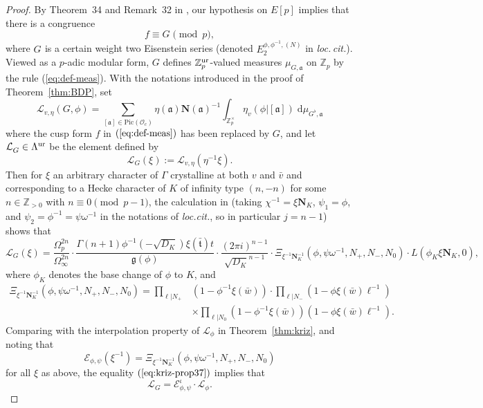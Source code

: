 \documentclass[10pt]{amsart}
\numberwithin{equation}{section}
\theoremstyle{definition}
\theoremstyle{remark}
\newcommand{\Z}{\mathbb{Z}}
\newcommand{\Lcal}{\mathcal{L}}
\begin{document}
\begin{proof} 
By Theorem~34 and Remark~32 in \cite{kriz}, our hypothesis on $E[p]$ implies that there is a congruence
\begin{equation}\label{eq:cong-mf}
f\equiv G^{}\pmod{p},
\end{equation}
where $G^{}$ is a certain weight two Eisenstein series (denoted $E_{2}^{\phi,\phi^{-1},(N)}$ in \emph{loc.\,cit.}). 
Viewed as a $p$-adic modular form, $G$ defines $\Z_p^{\rm ur}$-valued measures $\mu_{G,\mathfrak{a}}$
on $\Z_p$ by the rule (\ref{eq:def-meas}). With the notations introduced in the proof of Theorem~\ref{thm:BDP}, set
\begin{equation}\label{eq:Eis-measure}
\mathscr{L}_{v,\eta}(G,\phi)=
\sum_{[\mathfrak{a}]\in\mathrm{Pic}(\mathcal{O}_c)}
\eta(\mathfrak{a})\mathbf{N}(\mathfrak{a})^{-1}
\int_{\Z_p^\times}\eta_v(\phi\vert[\mathfrak{a}])\;\mathrm{d}\mu_{G^\flat,{\mathfrak{a}}}
\end{equation}
where the cusp form $f$ in $(\ref{eq:def-meas})$ has been replaced by $G$, and let $\mathcal{L}_G^{}\in\Lambda^{\rm ur}$ be the element defined by 
\[
\Lcal_G(\xi):=\mathscr{L}_{v,\eta}(\eta^{-1}\xi).
\]
Then for $\xi$ an arbitrary character of $\Gamma$ crystalline at both $v$ and $\bar{v}$ and corresponding to a Hecke character of $K$ of infinity type $(n,-n)$ for some $n\in\Z_{>0}$ with $n\equiv 0\pmod{p-1}$, the calculation in \cite[Prop.~37]{kriz} (taking $\chi^{-1}=\xi\mathbf{N}_K$, $\psi_1=\phi$, and $\psi_2=\phi^{-1}=\psi\omega^{-1}$ in the notations of \emph{loc.cit.}, so in particular $j=n-1$) shows that
\begin{equation}\label{eq:kriz-prop37}
\Lcal_G(\xi)=\frac{\Omega_p^{2n}}{\Omega_\infty^{2n}}\cdot\frac{\Gamma(n+1)\phi^{-1}(-\sqrt{D_K})\xi(\bar{\mathfrak{t}})t}{\mathfrak{g}(\phi)}\cdot\frac{(2\pi i)^{n-1}}{\sqrt{D_K}^{n-1}}\cdot
\Xi_{\xi^{-1}\mathbf{N}_K^{-1}}(\phi,\psi\omega^{-1},N_+,N_-,N_0)\cdot L(\phi_K\xi\mathbf{N}_K,0),
\end{equation}
where $\phi_K$ denotes the base change of $\phi$ to $K$, and
\begin{align*}
\Xi_{\xi^{-1}\mathbf{N}_K^{-1}}(\phi,\psi\omega^{-1},N_+,N_-,N_0)=\prod_{\ell\vert N_+}&(1-\phi^{-1}\xi(\bar{w}))\cdot\prod_{\ell\vert N_-}(1-\phi\xi(\bar{w})\ell^{-1})\\
&\times\prod_{\ell\vert N_0}(1-\phi^{-1}\xi(\bar{w}))(1-\phi\xi(\bar{w})\ell^{-1}).
\end{align*}
Comparing with the interpolation property of $\mathcal{L}_\phi$ in Theorem~\ref{thm:kriz}, and noting that
\[
\mathcal{E}_{\phi,\psi}(\xi^{-1})=\Xi_{\xi^{-1}\mathbf{N}_K^{-1}}(\phi,\psi\omega^{-1},N_+,N_-,N_0)
\]
for all $\xi$ as above, the equality $(\ref{eq:kriz-prop37})$ implies that
\begin{equation}\label{eq:cor-37}
\Lcal_G = \mathcal{E}_{\phi,\psi}^\iota\cdot\Lcal_\phi.
\end{equation}


\end{proof}
\end{document}
